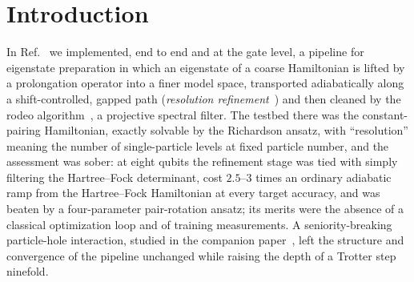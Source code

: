 \documentclass[
  aps,
  prc,
  reprint,
  superscriptaddress,
  floatfix,
  nofootinbib
]{revtex4-2}
\begin{document}
\begin{abstract}
$9.1\times10^4$ CNOTs for infidelities $10^{-3}$, $3\times10^{-4}$ and
$10^{-4}$; the pruned 98-parameter UCCSD needs three times more, the
two-local refinement path four to seven times more, and the projector path
sixteen times more, almost entirely in the coarse term conditioned on all
antibonding qubits.
\textbf{Conclusions:} Lattice refinement of the Hubbard model is a
validated, optimizer-free and measurement-free route to the fine ground
state whose convergence is governed by a symmetry-protected gap, and the
symmetry diagnostics identify in advance the coarse states that cannot be
refined.  At this size it is not a gate saver, however: an adiabatic ramp that
switches on the interaction from the free-fermion determinant reaches the
same accuracy at a fraction of the cost.  The comparison fixes the baseline that larger lattices, where the
free-fermion overlap decays, must beat.
\end{abstract}

\maketitle

\section{Introduction}
In Ref.~\cite{EigenQPairing2026} we implemented, end to end and at the gate
level, a pipeline for eigenstate preparation in which an eigenstate of a
coarse Hamiltonian is lifted by a prolongation operator into a finer model
space, transported adiabatically along a shift-controlled, gapped path
(\emph{resolution refinement}~\cite{Bogner2026}) and then cleaned by the
rodeo algorithm~\cite{Choi2021,Qian2024}, a projective spectral filter.  The
testbed there was the constant-pairing Hamiltonian, exactly solvable by the
Richardson ansatz, with ``resolution'' meaning the number of single-particle
levels at fixed particle number, and the assessment was sober: at eight
qubits the refinement stage was tied with simply filtering the
Hartree--Fock determinant, cost $2.5$--$3$ times an ordinary adiabatic ramp
from the Hartree--Fock Hamiltonian at every target accuracy, and was beaten
by a four-parameter pair-rotation ansatz; its merits were the absence of a
classical optimization loop and of training measurements.  A seniority-breaking
particle-hole interaction, studied in the companion paper~\cite{PHcompanion},
left the structure and convergence of the pipeline unchanged while raising the
depth of a Trotter step ninefold.
\end{document}
